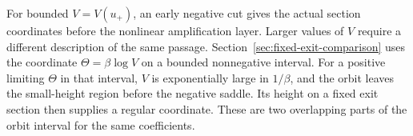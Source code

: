 For bounded \(V=V(u_+)\), an early negative cut gives the actual
section coordinates before the nonlinear amplification layer. Larger
values of \(V\) require a different description of the same passage.
Section~\ref{sec:fixed-exit-comparison}
uses the coordinate \(\Theta=\beta\log V\) on a bounded nonnegative
interval. For a positive limiting \(\Theta\) in that interval,
\(V\) is exponentially large in \(1/\beta\), and the orbit leaves
the small-height region before the negative saddle. Its height on a
fixed exit section then supplies a regular coordinate. These are two
overlapping parts of the orbit interval for the same coefficients.



